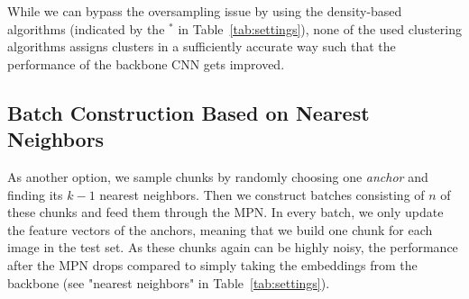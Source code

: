 \documentclass{article}
\begin{document}
While we can bypass the oversampling issue by using the density-based algorithms (indicated by the $^*$ in Table~\ref{tab:settings}), none of the used clustering algorithms assigns clusters in a sufficiently accurate way such that the performance of the backbone CNN gets improved. 

\begin{table}[hbt!]
\centering
{}
\caption{Performance of different settings of using the MPN during test time as well as the performance of teacher student approaches. $\dagger$ indicates clustering algorithms that need a fixed number of clusters (900 clusters), * indicates density-based clustering algorithms (eps=0.9, min sample=5)}
\label{tab:settings}
\vspace{0.3cm}
\end{table} 

\subsection{Batch Construction Based on Nearest Neighbors}
As another option, we sample chunks by randomly choosing one \textit{anchor} and finding its $k-1$ nearest neighbors. Then we construct batches consisting of $n$ of these chunks and feed them through the MPN. In every batch, we only update the feature vectors of the anchors, meaning that we build one chunk for each image in the test set. As these chunks again can be highly noisy, the performance after the MPN drops compared to simply taking the embeddings from the backbone (see "nearest neighbors" in Table~\ref{tab:settings}).
\end{document}
